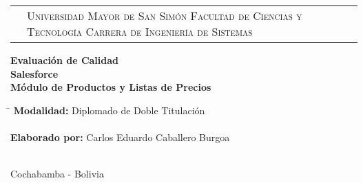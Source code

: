 \newcommand{\umsslogo}{
\adjustbox{valign=t}{}
}
\newcommand{\fcytlogo}{
\adjustbox{valign=t}{}
}

\begin{titlepage}

\begin{tabular}[t]{c p{8.6cm} c}
\umsslogo &
\vfill
\large{\textsc{Universidad Mayor de San Simón}} \newline
\large{\textsc{Facultad de Ciencias y Tecnología}} \newline
\large{\textsc{Carrera de Ingeniería de Sistemas}} &
\fcytlogo \\
\end{tabular}
\vfill
\begin{center}
\huge{\bf{Evaluación de Calidad\\
Salesforce\\
Módulo de Productos y Listas de Precios}}
\end{center}
\vfill
\begin{tabbing}
\hspace{4cm}\=\+
\textbf{Modalidad:} Diplomado de Doble Titulación\\
\\
\textbf{Elaborado por:} Carlos Eduardo Caballero Burgoa\\
\\
\end{tabbing}
\begin{center}
Cochabamba - Bolivia
\end{center}
\end{titlepage}

